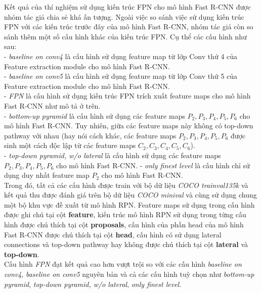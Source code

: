 {    \noindent
    Kết quả của thí nghiệm sử dụng kiến trúc FPN cho mô hình Fast R-CNN được nhóm tác giả chia sẻ khá ấn tượng.
    Ngoài việc so sánh việc sử dụng kiến trúc FPN với các kiến trúc trước đây của mô hình Fast R-CNN, nhóm tác giả còn so sánh thêm một số cấu hình khác của kiến trúc FPN.
    Cụ thể các cấu hình như sau: \\
    - \textit{baseline on conv4} là cấu hình sử dụng feature map từ lớp Conv thứ 4 của Feature extraction module cho mô hình Fast R-CNN. \\
    - \textit{baseline on conv5} là cấu hình sử dụng feature map từ lớp Conv thứ 5 của Feature extraction module cho mô hình Fast R-CNN. \\
    - \textit{FPN} là cấu hình sử dụng kiến trúc FPN trích xuất feature maps cho mô hình Fast R-CNN như mô tả ở trên. \\
    - \textit{bottom-up pyramid} là cấu hình sử dụng các feature maps \textit{{${P}_{2}, {P}_{3}, {P}_{4}, {P}_{5}, {P}_{6}$}} cho mô hình Fast R-CNN.
    Tuy nhiên, giữa các feature maps này không có top-down pathway với nhau (hay nói cách khác, các feature maps \textit{{${P}_{2}, {P}_{3}, {P}_{4}, {P}_{5}, {P}_{6}$}} được sinh một cách độc lập từ các feature maps \textit{{${C}_{2}, {C}_{3}, {C}_{4}, {C}_{5}, {C}_{6}$}}). \\
    - \textit{top-down pyramid, w/o lateral} là cấu hình sử dụng các feature maps \textit{{${P}_{2}, {P}_{3}, {P}_{4}, {P}_{5}, {P}_{6}$}} cho mô hình Fast R-CNN.
    - \textit{only finest level} là cấu hình chỉ sử dụng duy nhất feature map \textit{${P}_{2}$} cho mô hình Fast R-CNN. \\
    Trong đó, tất cả các cấu hình được train với bộ dữ liệu \textit{COCO trainval135k} và kết quả thu được đánh giá trên bộ dữ liệu \textit{COCO minival} và cùng sử dụng chung một bộ khu vực đề xuất từ mô hình RPN.
    Feature maps sử dụng trong cấu hình được ghi chú tại cột \textbf{feature}, kiến trúc mô hình RPN sử dụng trong từng cấu hình được chú thích tại cột \textbf{proposals}, cấu hình của phần head của mô hình Fast R-CNN được chú thích tại cột \textbf{head}, cấu hình có sử dụng lateral connections và top-down pathway hay không được chú thích tại cột \textbf{lateral} và \textbf{top-down}. \\
    Cấu hình \textit{FPN} đạt kết quả cao hơn vượt trội so với các cấu hình \textit{baseline on conv4}, \textit{baseline on conv5} nguyên bản và cả các cấu hình tuỳ chọn như \textit{bottom-up pyramid}, \textit{top-down pyramid, w/o lateral}, \textit{only finest level}.

}
